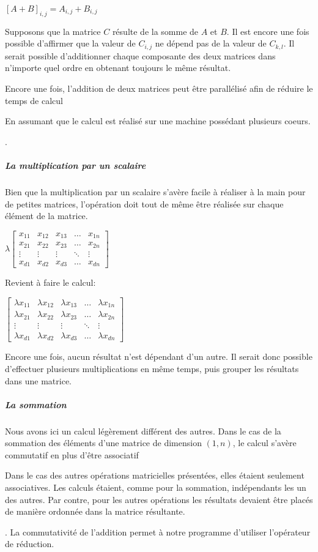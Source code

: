 \documentclass[letterpaper,10pt,french]{sphinxmanual}
\begin{document}
\([A+B]_{i,j} = A_{i,j} + B_{i,j}\)

Supposons que la matrice \(C\) résulte de la somme de \(A\) et \(B\). Il est encore une fois possible d’affirmer que la valeur de \(C_{i,j}\) ne dépend pas de la valeur de \(C_{k,l}\). Il serait possible d’additionner chaque composante des deux matrices dans n’importe quel ordre en obtenant toujours le même résultat.

Encore une fois, l’addition de deux matrices peut être parallélisé afin de réduire le temps de calcul%
\begin{footnote}[25]\sphinxAtStartFootnote
En assumant que le calcul est réalisé sur une machine possédant plusieurs coeurs.
%
\end{footnote}.


\subparagraph{La multiplication par un scalaire}
\label{\detokenize{preprocessing:la-multiplication-par-un-scalaire}}
Bien que la multiplication par un scalaire s’avère facile à réaliser à la main pour de petites matrices, l’opération doit tout de même être réalisée sur chaque élément de la matrice.

\( \lambda \begin{bmatrix}
    x_{11} & x_{12} & x_{13} & \dots  & x_{1n} \\
    x_{21} & x_{22} & x_{23} & \dots  & x_{2n} \\
    \vdots & \vdots & \vdots & \ddots & \vdots \\
    x_{d1} & x_{d2} & x_{d3} & \dots  & x_{dn}
\end{bmatrix} \)

Revient à faire le calcul:

\(\begin{bmatrix}
    \lambda x_{11} & \lambda x_{12} & \lambda x_{13} & \dots  & \lambda x_{1n} \\
    \lambda x_{21} & \lambda x_{22} & \lambda x_{23} & \dots  & \lambda x_{2n} \\
    \vdots & \vdots & \vdots & \ddots & \vdots \\
    \lambda x_{d1} & \lambda x_{d2} & \lambda x_{d3} & \dots  & \lambda x_{dn}
\end{bmatrix}\)

Encore une fois, aucun résultat n’est dépendant d’un autre. Il serait donc possible d’effectuer plusieurs multiplications en même temps, puis grouper les résultats dans une matrice.


\subparagraph{La sommation}
\label{\detokenize{preprocessing:la-sommation}}
Nous avons ici un calcul légèrement différent des autres. Dans le cas de la sommation des éléments d’une matrice de dimension \((1,n)\), le calcul s’avère commutatif en plus d’être associatif%
\begin{footnote}[26]\sphinxAtStartFootnote
Dans le cas des autres opérations matricielles présentées, elles étaient seulement associatives. Les calculs étaient, comme pour la sommation, indépendants les un des autres. Par contre, pour les autres opérations les résultats devaient être placés de manière ordonnée dans la matrice résultante.
%
\end{footnote}. La commutativité de l’addition permet à notre programme d’utiliser l’opérateur de réduction.
\end{document}
